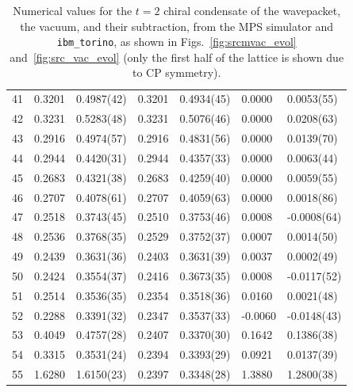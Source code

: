 \documentclass[aps, prc, tightenlines,superscriptaddress, letterpaper, amsmath, amssymb, preprintnumbers, floatfix, longbibliography, nofootinbib]{revtex4-2}
\begin{document}
\begin{table}[!htb]
{\begin{tabularx}{\textwidth}{| c || Y | Y | Y | Y | Y | Y |}
41	&	0.3201	&	0.4987(42)	&	0.3201	&	0.4934(45)	&	0.0000	&	0.0053(55)	\\
42	&	0.3231	&	0.5283(48)	&	0.3231	&	0.5076(46)	&	0.0000	&	0.0208(63)	\\
43	&	0.2916	&	0.4974(57)	&	0.2916	&	0.4831(56)	&	0.0000	&	0.0139(70)	\\
44	&	0.2944	&	0.4420(31)	&	0.2944	&	0.4357(33)	&	0.0000	&	0.0063(44)	\\
45	&	0.2683	&	0.4321(38)	&	0.2683	&	0.4259(40)	&	0.0000	&	0.0059(55)	\\
46	&	0.2707	&	0.4078(61)	&	0.2707	&	0.4059(63)	&	0.0000	&	0.0018(86)	\\
47	&	0.2518	&	0.3743(45)	&	0.2510	&	0.3753(46)	&	0.0008	&	-0.0008(64)	\\
48	&	0.2536	&	0.3768(35)	&	0.2529	&	0.3752(37)	&	0.0007	&	0.0014(50)	\\
49	&	0.2439	&	0.3631(36)	&	0.2403	&	0.3631(39)	&	0.0037	&	0.0002(49)	\\
50	&	0.2424	&	0.3554(37)	&	0.2416	&	0.3673(35)	&	0.0008	&	-0.0117(52)	\\
51	&	0.2514	&	0.3536(35)	&	0.2354	&	0.3518(36)	&	0.0160	&	0.0021(48)	\\
52	&	0.2288	&	0.3391(32)	&	0.2347	&	0.3537(33)	&	-0.0060	&	-0.0148(43)	\\
53	&	0.4049	&	0.4757(28)	&	0.2407	&	0.3370(30)	&	0.1642	&	0.1386(38)	\\
54	&	0.3315	&	0.3531(24)	&	0.2394	&	0.3393(29)	&	0.0921	&	0.0137(39)	\\
55	&	1.6280	&	1.6150(23)	&	0.2397	&	0.3348(28)	&	1.3880	&	1.2800(38)	\\ \hline
\end{tabularx}}
\caption{Numerical values for the $t=2$ chiral condensate of the wavepacket, the vacuum, and their subtraction, from the MPS simulator and {\tt ibm\_torino}, as shown in Figs.~\ref{fig:srcmvac_evol} and~\ref{fig:src_vac_evol} (only the first half of the lattice is shown due to CP symmetry).}
 \label{tab:tablet2}
\end{table}
%
\end{document}
